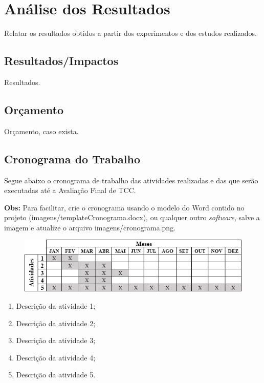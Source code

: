 \chapter{Análise dos Resultados}
\label{cap:04}

Relatar os resultados obtidos a partir dos experimentos e dos estudos realizados.


\section{Resultados/Impactos}

Resultados.


\section{Orçamento}

Orçamento, caso exista.


\section{Cronograma do Trabalho}

Segue abaixo o cronograma de trabalho das atividades realizadas e das que serão executadas até a Avaliação Final de TCC.

\textbf{Obs:} Para facilitar, crie o cronograma usando o modelo do Word contido no projeto (imagens/templateCronograma.docx), ou qualquer outro
\textit{software}, salve a imagem e atualize o arquivo imagens/cronograma.png.

\FloatBarrier
\begin{figure}[!htbp]
	\centering
	\includegraphics[scale=1]{imagens/cronograma}
\end{figure}
\FloatBarrier

\begin{enumerate}
	\item Descrição da atividade 1;
	\item Descrição da atividade 2;
	\item Descrição da atividade 3;
	\item Descrição da atividade 4;
	\item Descrição da atividade 5.
\end{enumerate}
